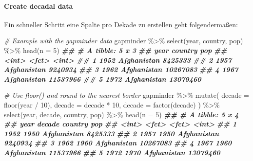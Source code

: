 \documentclass[
]{article}
\newenvironment{Shaded}{\begin{snugshade}}{\end{snugshade}}
\newcommand{\AttributeTok}[1]{\textcolor[rgb]{0.77,0.63,0.00}{#1}}
\newcommand{\CommentTok}[1]{\textcolor[rgb]{0.56,0.35,0.01}{\textit{#1}}}
\newcommand{\DecValTok}[1]{\textcolor[rgb]{0.00,0.00,0.81}{#1}}
\newcommand{\DocumentationTok}[1]{\textcolor[rgb]{0.56,0.35,0.01}{\textbf{\textit{#1}}}}
\newcommand{\FunctionTok}[1]{\textcolor[rgb]{0.00,0.00,0.00}{#1}}
\newcommand{\NormalTok}[1]{#1}
\newcommand{\SpecialCharTok}[1]{\textcolor[rgb]{0.00,0.00,0.00}{#1}}
\begin{document}
\hypertarget{create-decadal-data}{%
\paragraph{Create decadal data}\label{create-decadal-data}}

Ein schneller Schritt eine Spalte pro Dekade zu erstellen geht folgendermaßen:

\begin{Shaded}
\begin{Highlighting}[]
\CommentTok{\# Example with the gapminder data }
\NormalTok{gapminder }\SpecialCharTok{\%\textgreater{}\%}
  \FunctionTok{select}\NormalTok{(year, country, pop) }\SpecialCharTok{\%\textgreater{}\%}
  \FunctionTok{head}\NormalTok{(}\AttributeTok{n =} \DecValTok{5}\NormalTok{)}
\DocumentationTok{\#\# \# A tibble: 5 x 3}
\DocumentationTok{\#\#    year country          pop}
\DocumentationTok{\#\#   \textless{}int\textgreater{} \textless{}fct\textgreater{}          \textless{}int\textgreater{}}
\DocumentationTok{\#\# 1  1952 Afghanistan  8425333}
\DocumentationTok{\#\# 2  1957 Afghanistan  9240934}
\DocumentationTok{\#\# 3  1962 Afghanistan 10267083}
\DocumentationTok{\#\# 4  1967 Afghanistan 11537966}
\DocumentationTok{\#\# 5  1972 Afghanistan 13079460}

\CommentTok{\# Use floor() and round to the nearest border}
\NormalTok{gapminder }\SpecialCharTok{\%\textgreater{}\%}
  \FunctionTok{mutate}\NormalTok{(}
    \AttributeTok{decade =} \FunctionTok{floor}\NormalTok{(year }\SpecialCharTok{/} \DecValTok{10}\NormalTok{),  }
    \AttributeTok{decade =}\NormalTok{ decade }\SpecialCharTok{*} \DecValTok{10}\NormalTok{, }
    \AttributeTok{decade =} \FunctionTok{factor}\NormalTok{(decade)}
\NormalTok{  ) }\SpecialCharTok{\%\textgreater{}\%}
  \FunctionTok{select}\NormalTok{(year, decade, country, pop) }\SpecialCharTok{\%\textgreater{}\%}
  \FunctionTok{head}\NormalTok{(}\AttributeTok{n =} \DecValTok{5}\NormalTok{)}
\DocumentationTok{\#\# \# A tibble: 5 x 4}
\DocumentationTok{\#\#    year decade country          pop}
\DocumentationTok{\#\#   \textless{}int\textgreater{} \textless{}fct\textgreater{}  \textless{}fct\textgreater{}          \textless{}int\textgreater{}}
\DocumentationTok{\#\# 1  1952 1950   Afghanistan  8425333}
\DocumentationTok{\#\# 2  1957 1950   Afghanistan  9240934}
\DocumentationTok{\#\# 3  1962 1960   Afghanistan 10267083}
\DocumentationTok{\#\# 4  1967 1960   Afghanistan 11537966}
\DocumentationTok{\#\# 5  1972 1970   Afghanistan 13079460}
\end{Highlighting}
\end{Shaded}
\end{document}

